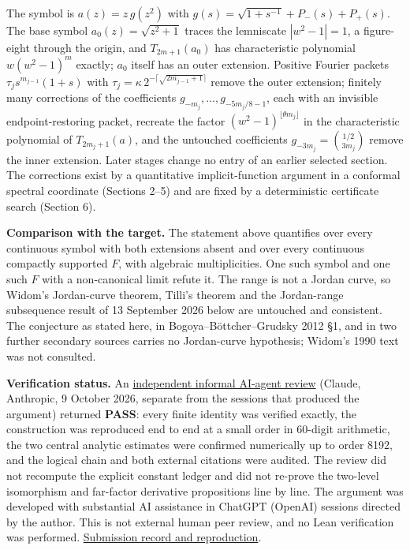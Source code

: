 \documentclass[11pt,a4paper]{article}
\begin{document}
The symbol is \(a(z)=z\,g(z^2)\) with
\(g(s)=\sqrt{1+s^{-1}}+P_-(s)+P_+(s)\). The base symbol
\(a_0(z)=\sqrt{z^2+1}\) traces the lemniscate \(|w^2-1|=1\), a
figure-eight through the origin, and \(T_{2m+1}(a_0)\) has
characteristic polynomial \(w(w^2-1)^m\) exactly; \(a_0\) itself has an
outer extension. Positive Fourier packets \(\tau_js^{m_{j-1}}(1+s)\)
with \(\tau_j=\kappa\,2^{-\lceil\sqrt{2m_{j-1}+1}\rceil}\) remove the
outer extension; finitely many corrections of the coefficients
\(g_{-m_j},\dots,g_{-5m_j/8-1}\), each with an invisible
endpoint-restoring packet, recreate the factor
\((w^2-1)^{\lfloor\theta m_j\rfloor}\) in the characteristic polynomial
of \(T_{2m_j+1}(a)\), and the untouched coefficients
\(g_{-3m_j}=\binom{1/2}{3m_j}\) remove the inner extension. Later stages
change no entry of an earlier selected section. The corrections exist by
a quantitative implicit-function argument in a conformal spectral
coordinate (Sections 2--5) and are fixed by a deterministic certificate
search (Section 6).

\textbf{Comparison with the target.} The statement above quantifies over
every continuous symbol with both extensions absent and over every
continuous compactly supported \(F\), with algebraic multiplicities. One
such symbol and one such \(F\) with a non-canonical limit refute it. The
range is not a Jordan curve, so Widom's Jordan-curve theorem, Tilli's
theorem and the Jordan-range subsequence result of 13 September 2026
below are untouched and consistent. The conjecture as stated here, in
Bogoya--Böttcher--Grudsky 2012 §1, and in two further secondary sources
carries no Jordan-curve hypothesis; Widom's 1990 text was not consulted.

\textbf{Verification status.} An
\href{https://github.com/ajt60gaibb/OpenProblemsInNLA/blob/main/eigenvalues-and-inverse-problems/SP-14/references/thalhammer-2026-10-09/verification/independent-review-2026-10-09.md}{independent
informal AI-agent review} (Claude, Anthropic, 9 October 2026, separate
from the sessions that produced the argument) returned \textbf{PASS}:
every finite identity was verified exactly, the construction was
reproduced end to end at a small order in 60-digit arithmetic, the two
central analytic estimates were confirmed numerically up to order 8192,
and the logical chain and both external citations were audited. The
review did not recompute the explicit constant ledger and did not
re-prove the two-level isomorphism and far-factor derivative
propositions line by line. The argument was developed with substantial
AI assistance in ChatGPT (OpenAI) sessions directed by the author. This
is not external human peer review, and no Lean verification was
performed.
\href{https://github.com/ajt60gaibb/OpenProblemsInNLA/blob/main/eigenvalues-and-inverse-problems/SP-14/references/thalhammer-2026-10-09/README.md}{Submission
record and reproduction}.
\end{document}
